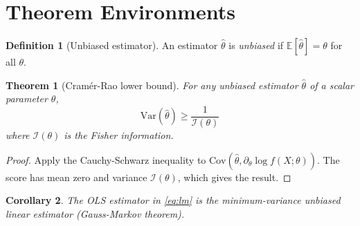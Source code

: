 \documentclass[12pt, a4paper]{article}
\newcommand{\E}{\mathbb{E}}
\newcommand{\Var}{\mathrm{Var}}
\newcommand{\Cov}{\mathrm{Cov}}
\newtheorem{theorem}{Theorem}[section]
\newtheorem{corollary}[theorem]{Corollary}
\theoremstyle{definition}
\newtheorem{definition}{Definition}[section]
\theoremstyle{remark}
\begin{document}
\section{Theorem Environments}

\begin{definition}[Unbiased estimator]
  An estimator $\hat{\theta}$ is \emph{unbiased} if
  $\E[\hat{\theta}] = \theta$ for all $\theta$.
\end{definition}

\begin{theorem}[Cramér-Rao lower bound]
  \label{thm:crlb}
  For any unbiased estimator $\hat{\theta}$ of a scalar
  parameter $\theta$,
  \begin{equation}
    \Var(\hat{\theta}) \geq \frac{1}{\mathcal{I}(\theta)}
  \end{equation}
  where $\mathcal{I}(\theta)$ is the Fisher information.
\end{theorem}

\begin{proof}
  Apply the Cauchy-Schwarz inequality to
  $\Cov\!\left(\hat{\theta}, \partial_\theta \log f(X;\theta)\right)$.
  The score has mean zero and variance $\mathcal{I}(\theta)$,
  which gives the result.
\end{proof}

\begin{corollary}
  The OLS estimator in \eqref{eq:lm} is the minimum-variance
  unbiased linear estimator (Gauss-Markov theorem).
\end{corollary}
\end{document}

